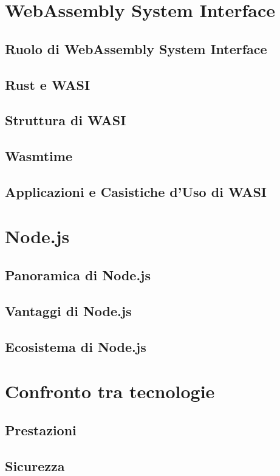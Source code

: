 \newpage
\section{WebAssembly System Interface}
\label{sec:WASI}
\subsection{Ruolo di WebAssembly System Interface}
\subsection{Rust e WASI}
\subsection{Struttura di WASI}
\subsection{Wasmtime}
\subsection{Applicazioni e Casistiche d'Uso di WASI}

\newpage
\section{Node.js}
\label{sec:Node}
\subsection{Panoramica di Node.js}
\subsection{Vantaggi di Node.js}
\subsection{Ecosistema di Node.js}

\newpage
\section{Confronto tra tecnologie}
\label{sec:Confronto}
\subsection{Prestazioni}
\subsection{Sicurezza}
